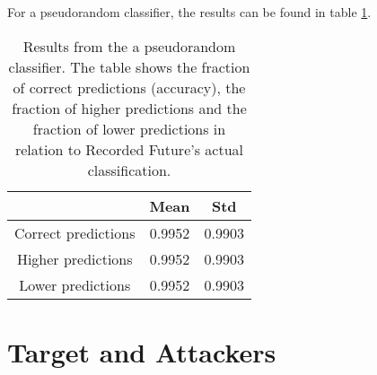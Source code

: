For a pseudorandom classifier, the results can be found in table \ref{randClass}.

\begin{table}[h!]
    \centering
    \caption{Results from the a pseudorandom classifier. The table shows the fraction of correct predictions (accuracy), the fraction of higher predictions and the fraction of lower predictions in relation to Recorded Future's actual classification.}
    \begin{tabular}{|c|c|c|}
    \hline
        ~   & Mean & Std  \\ \hline
        Correct predictions & 0.9952 &  0.9903 \\
        Higher predictions  & 0.9952 &  0.9903\\
        Lower predictions   & 0.9952 &  0.9903\\ \hline
    \end{tabular}
    \label{randClass}
\end{table}

\section{Target and Attackers}


